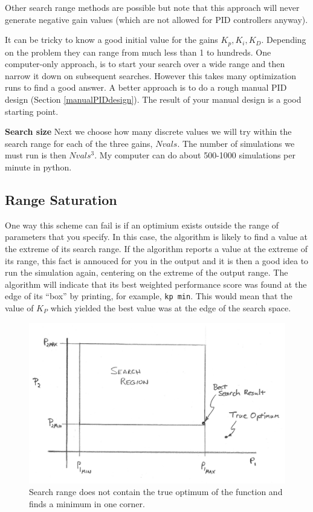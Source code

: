 Other search range methods are possible but  note that this approach will never generate negative gain values (which are not allowed for PID controllers anyway).	%

It can be tricky to know a good initial value for the gains $K_p,K_i, K_D$.   Depending on the problem they can range from much less than 1 to hundreds.   One computer-only approach, is to start your search over a wide range and then narrow it down on subsequent searches.  However this takes many optimization runs to find a good answer.   A better approach is to do a rough manual PID design (Section \ref{manualPIDdesign}).  The result of your manual design is a good starting point.

{\bf Search size} Next we choose how many discrete values we will try within the search range for each of the three gains, $Nvals$.  The number of simulations we must run is then $Nvals^3$.    My computer can   do about 500-1000 simulations per minute in python.	%


\subsection{Range Saturation}

One way this scheme can fail is if an optimium exists outside the range of parameters that you specify.  In this case, the algorithm is likely to find a value at the extreme of its search range.  If the algorithm reports a value at the extreme of its range, this fact is annouced for you in the output and it is then a good idea to run the simulation again, centering on the extreme of the output range.   The algorithm will indicate that its best weighted performance score was found at the edge of its ``box'' by printing, for example, {\tt kp min}.  This would mean that the value of $K_P$ which yielded the best value was at the edge of the search space.	%


\begin{figure}\centering
\includegraphics[width=4.5in]{figs10/00649a.png}
\caption{Search range does not contain the true optimum of the function and finds a minimum in one corner.}\label{rangesat}
\end{figure}


